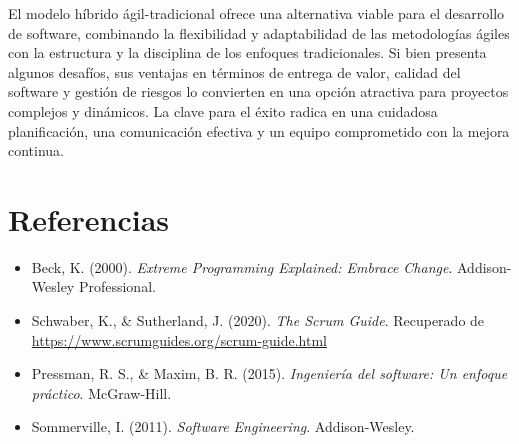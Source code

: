 \documentclass[12pt, spanish]{article}
\begin{document}
El modelo híbrido ágil-tradicional ofrece una alternativa viable para el desarrollo de software, combinando la flexibilidad y adaptabilidad de las metodologías ágiles con la estructura y la disciplina de los enfoques tradicionales. Si bien presenta algunos desafíos, sus ventajas en términos de entrega de valor, calidad del software y gestión de riesgos lo convierten en una opción atractiva para proyectos complejos y dinámicos. La clave para el éxito radica en una cuidadosa planificación, una comunicación efectiva y un equipo comprometido con la mejora continua.

\section*{Referencias}

\begin{itemize}
    \item Beck, K. (2000). \textit{Extreme Programming Explained: Embrace Change}. Addison-Wesley Professional.
    \item Schwaber, K., & Sutherland, J. (2020). \textit{The Scrum Guide}. Recuperado de \href{https://www.scrumguides.org/scrum-guide.html}{https://www.scrumguides.org/scrum-guide.html}
    \item Pressman, R. S., & Maxim, B. R. (2015). \textit{Ingeniería del software: Un enfoque práctico}. McGraw-Hill.
    \item Sommerville, I. (2011). \textit{Software Engineering}. Addison-Wesley.
\end{itemize}
\end{document}
